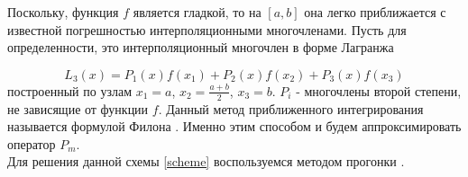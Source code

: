 Поскольку, функция $f$ является гладкой, то на $[a, b]$ она легко приближается 
с известной погрешностью интерполяционными многочленами. Пусть для 
определенности, это интерполяционный многочлен в форме Лагранжа

\begin{equation}
    L_3(x) = P_1(x)f(x_1) + P_2(x)f(x_2) + P_3(x)f(x_3)
\end{equation}
построенный по узлам $x_1 = a$, $x_2 = \frac{a + b}{2}$, $x_3 = b$. $P_i$ - 
многочлены второй степени, не зависящие от функции $f$. Данный метод 
приближенного интегрирования называется формулой Филона \cite{Philon}. Именно этим 
способом и будем аппроксимировать оператор $P_m$.\\

Для решения данной схемы \eqref{scheme} воспользуемся методом прогонки
\cite{TDMA}.
